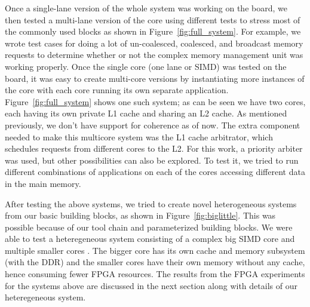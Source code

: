 Once a single-lane version of the whole system was working on the board, we then tested a multi-lane version of the core using different tests to stress most of the commonly used blocks as shown in Figure~\ref{fig:full_system}. For example, we wrote test cases for doing a lot of un-coalesced, coalesced, and broadcast memory requests to determine whether or not the complex memory management unit was working properly. Once the single core (one lane or SIMD) was tested on the board, it was easy to create multi-core versions by instantiating more instances of the core with each core running its own separate application. Figure~\ref{fig:full_system} shows one such system; as can be seen we have two cores, each having its own private L1 cache and sharing an L2 cache. As mentioned previously, we don't have support for coherence as of now. The extra component needed to make this multicore system was the L1 cache arbitrator, which schedules requests from different cores to the L2. For this work, a priority arbiter was used, but other possibilities can also be explored.  To test it, we tried to run different combinations of applications on each of the cores accessing different data in the main memory. 


After testing the above systems, we tried to create novel heterogeneous systems from our basic building blocks, as shown in Figure~\ref{fig:biglittle}. This was possible because of our tool chain and parameterized building blocks. We were able to test a heteregeneous system consisting of a complex big SIMD core and multiple smaller cores \cite{biglittle}. The bigger core has its own cache and memory subsystem (with the DDR) and the smaller cores have their own memory without any cache, hence consuming fewer FPGA resources. The results from the FPGA experiments for the systems above are discussed in the next section along with details of our heteregeneous system.
